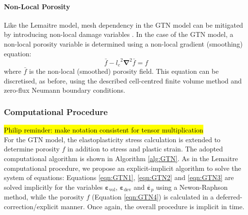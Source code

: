 \documentclass[sn-mathphys,Numbered,draft]{sn-jnl}%
\newcommand{\bb}{\boldsymbol}
\begin{document}
\paragraph{Non-Local Porosity}

Like the Lemaitre model, mesh dependency in the GTN model can be mitigated by introducing non-local damage variables \cite{reusch_non-local_2003, leclerc_micromechanics-based_2020}.
In the case of the GTN model, a non-local porosity variable is determined using a non-local gradient (smoothing) equation:
\begin{equation}
	\bar{f} - {l_c}^2 \bb{\nabla}^2 \bar{f} = f
\end{equation}
where $\bar{f}$ is the non-local (smoothed) porosity field.
This equation can be discretised, as before, using the described cell-centred finite volume method and zero-flux Neumann boundary conditions.



\subsubsection{Computational Procedure}

\hl{Philip reminder: make notation consistent for tensor multiplication}\\
For the GTN model, the elastoplasticity stress calculation is extended to determine porosity $f$ in addition to stress and plastic strain.
The adopted computational algorithm is shown in Algorithm \ref{alg:GTN}.
As in the Lemaitre computational procedure, we propose an explicit-implicit algorithm to solve the system of equations:
Equations \ref{eqn:GTN1}, \ref{eqn:GTN2} and \ref{eqn:GTN3} are solved implicitly for the variables $\boldsymbol{\varepsilon}_\text{vol}$, $\boldsymbol{\varepsilon}_\text{dev}$ and $\overline{\boldsymbol{\varepsilon}}_p$ using a Newon-Raphson method, while the porosity $f$ (Equation \ref{eqn:GTN4}) is calculated in a deferred-correction/explicit manner.
Once again, the overall procedure is implicit in time.
\end{document}
